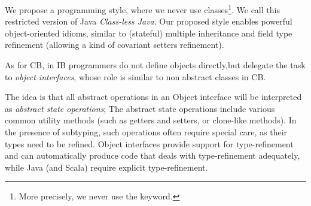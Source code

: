 %
%
%
%



We propose a programming style, where we never use classes\footnote{More precisely, we never use the \Q@class@ keyword.}.
We call this restricted version of Java \emph{Class-less Java}.
Our proposed style enables powerful object-oriented idioms, similar to 
(stateful) multiple inheritance and field type refinement 
(allowing a kind of covariant setters refinement).


As for CB, in IB programmers do not define objects directly,but delegate the task to
\emph{object interfaces}, whose role is similar to non abstract classes in CB.

The idea is that all abstract operations in an Object interface will be
interpreted as \emph{abstract state operations};  The abstract state
operations include various common utility methods (such as getters and
setters, or clone-like methods). In the presence of subtyping, such
operations often require special care, as their types need to be
refined. Object interfaces provide support for type-refinement and can
automatically produce code that deals with type-refinement
adequately, while Java (and Scala) require explicit type-refinement.


